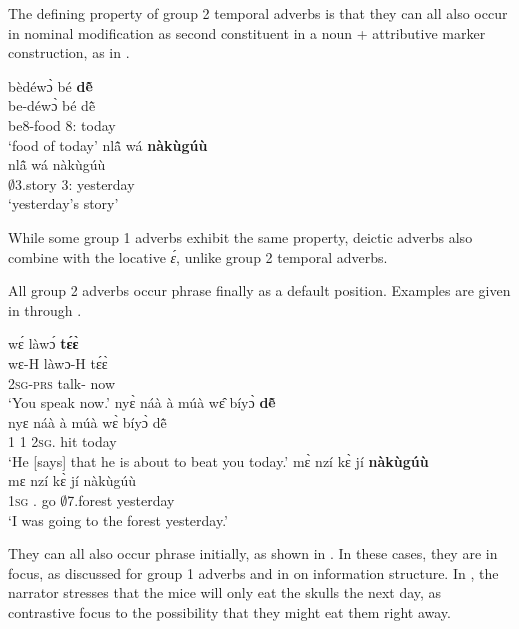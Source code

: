 The defining property of group 2 temporal adverbs is that they can all also occur in nominal modification as second constituent in a noun + attributive marker construction, as in .

\ea \label{G2nom}
  \ea  \label{G2nom1}
  \glll   bèdéwɔ̀ bé {\bfseries dẽ̂} \\
	be-déwɔ̀ bé dẽ̂  \\
           be8-food 8:{\ATT} today    \\
    \trans `food of today'
\ex\label{G2nom2}
 \glll  nlã̂ wá {\bfseries nàkùgúù} \\
	nlã̂ wá nàkùgúù \\
         $\emptyset$3.story 3:{\ATT} yesterday  \\
    \trans `yesterday's story'
\z
\z

\noindent While some group 1 adverbs exhibit the same property, deictic adverbs also combine with the locative {\itshape ɛ́}, unlike group 2 temporal adverbs.


All group 2 adverbs occur phrase finally as a default position. Examples are given in  through .

\ea \label{ADV2a}
  \glll wɛ́ làwɔ́ {\bfseries tɛ́ɛ̀}  \\
        wɛ-H làwɔ-H tɛ́ɛ̀  \\
         2\textsc{sg}-\textsc{prs} talk-{\R} now   \\
    \trans `You speak now.'
\ex \label{ADV2b}
  \glll  nyɛ̀ náà à múà wɛ̂ bíyɔ̀ {\bfseries dẽ̂} \\
        nyɛ náà à múà wɛ̀ bíyɔ̀ dẽ̂\\
           1 {\COMP} 1 {\PROSP} 2\textsc{sg}.{\OBJ} hit today \\
    \trans `He [says] that he is about to beat you today.'
\ex \label{ADV2c}
  \glll mɛ̀ nzí kɛ̀ jí {\bfseries nàkùgúù} \\
       mɛ nzí kɛ̀ jí nàkùgúù \\
      1\textsc{sg} {\PROG}.{\PST} go $\emptyset$7.forest yesterday \\
    \trans `I was going to the forest yesterday.'
\z

 
They can all also occur phrase initially, as shown in . In these cases, they are in focus, as discussed for group 1 adverbs and in  on information structure. In , the narrator stresses that the mice will only eat the skulls the next day, as contrastive focus to the possibility that they might eat them right away.


